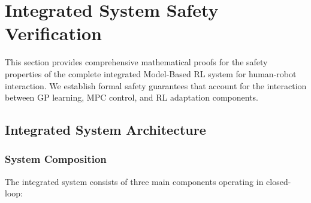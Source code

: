 \section{Integrated System Safety Verification}

This section provides comprehensive mathematical proofs for the safety properties of the complete integrated Model-Based RL system for human-robot interaction. We establish formal safety guarantees that account for the interaction between GP learning, MPC control, and RL adaptation components.

\subsection{Integrated System Architecture}

\subsubsection{System Composition}

The integrated system consists of three main components operating in closed-loop:

